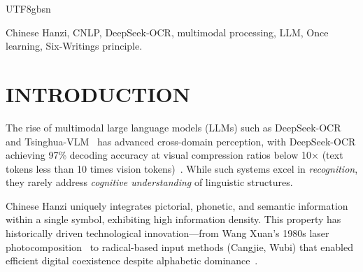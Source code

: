 \documentclass[conference]{IEEEtran}
\begin{document}
\begin{CJK*}{UTF8}{gbsn}


\begin{IEEEkeywords}
Chinese Hanzi, CNLP, DeepSeek-OCR, multimodal processing, LLM, Once learning, Six-Writings principle.
\end{IEEEkeywords}

\section{INTRODUCTION}
\label{sec:introduction}

The rise of multimodal large language models (LLMs) such as DeepSeek-OCR~\cite{wei2025deepseek} and Tsinghua-VLM~\cite{wang2024cogvlm} has advanced cross-domain perception, with DeepSeek-OCR achieving 97\% decoding accuracy at visual compression ratios below 10× (text tokens less than 10 times vision tokens)~\cite{wei2025deepseek}. While such systems excel in \textit{recognition}, they rarely address \textit{cognitive understanding} of linguistic structures.

Chinese Hanzi uniquely integrates pictorial, phonetic, and semantic information within a single symbol, exhibiting high information density. This property has historically driven technological innovation—from Wang Xuan’s 1980s laser photocomposition~\cite{weigang2022typewriter} to radical-based input methods (Cangjie, Wubi) that enabled efficient digital coexistence despite alphabetic dominance~\cite{weigang2025threshold}.


\end{CJK*}
\end{document}
